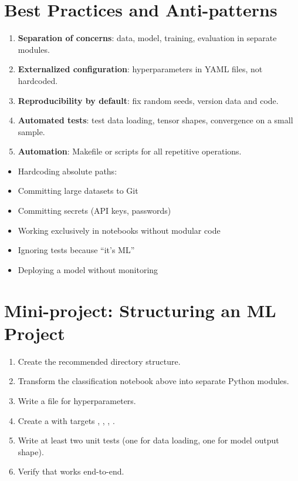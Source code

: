 \section{Best Practices and Anti-patterns}

\begin{bestpractice}[title=\textbf{Fundamental principles}]
\begin{enumerate}
  \item \textbf{Separation of concerns}: data, model, training, evaluation
    in separate modules.
  \item \textbf{Externalized configuration}: hyperparameters in YAML files,
    not hardcoded.
  \item \textbf{Reproducibility by default}: fix random seeds, version data
    and code.
  \item \textbf{Automated tests}: test data loading, tensor shapes,
    convergence on a small sample.
  \item \textbf{Automation}: Makefile or scripts for all repetitive
    operations.
\end{enumerate}
\end{bestpractice}

\begin{antipattern}[title=\textbf{Absolutely avoid}]
\begin{itemize}
  \item Hardcoding absolute paths: 
  \item Committing large datasets to Git
  \item Committing secrets (API keys, passwords)
  \item Working exclusively in notebooks without modular code
  \item Ignoring tests because ``it's ML''
  \item Deploying a model without monitoring
\end{itemize}
\end{antipattern}

\section{Mini-project: Structuring an ML Project}
\label{sec:mini-project-ch1}

\begin{miniproject}[title=\textbf{Mini-project 1: From notebook to structured project}]
\begin{enumerate}
  \item Create the recommended directory structure.
  \item Transform the classification notebook above into separate Python
    modules.
  \item Write a  file for hyperparameters.
  \item Create a  with targets , ,
    , .
  \item Write at least two unit tests (one for data loading, one for model
    output shape).
  \item Verify that  works end-to-end.
\end{enumerate}
\end{miniproject}

